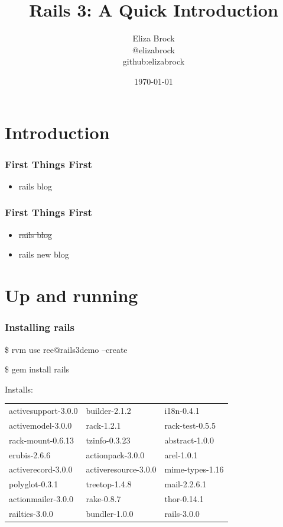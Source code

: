 \documentclass{beamer}
\title{Rails 3: A Quick Introduction}
\author{Eliza Brock  \\@elizabrock  \\github:elizabrock}
\date{\today}
\begin{document}
\begin{frame}
\titlepage
\end{frame}

\section{Introduction}
\begin{frame}
\frametitle{First Things First}
\pause
\begin{itemize}
\item rails blog
\end{itemize}
\end{frame}

\begin{frame}
\frametitle{First Things First}
\begin{itemize}
\item \sout{rails blog}
\item rails new blog
\end{itemize}
\end{frame}

\section{Up and running}
\begin{frame}
\frametitle{Installing rails}
\begin{semiverbatim}
\$ rvm use ree@rails3demo --create

\$ gem install rails
\end{semiverbatim}

\pause
Installs:\\
\begin{tabular}{l l l}
activesupport-3.0.0 & builder-2.1.2 & i18n-0.4.1 \\
activemodel-3.0.0 & rack-1.2.1 & rack-test-0.5.5 \\
rack-mount-0.6.13 & tzinfo-0.3.23 & abstract-1.0.0 \\
erubis-2.6.6 & actionpack-3.0.0 & arel-1.0.1 \\
activerecord-3.0.0 & activeresource-3.0.0 & mime-types-1.16 \\
polyglot-0.3.1 & treetop-1.4.8 & mail-2.2.6.1 \\
actionmailer-3.0.0 & rake-0.8.7 & thor-0.14.1 \\
railties-3.0.0 & bundler-1.0.0 & rails-3.0.0 \\
\end{tabular}
\end{frame}
\end{document}
